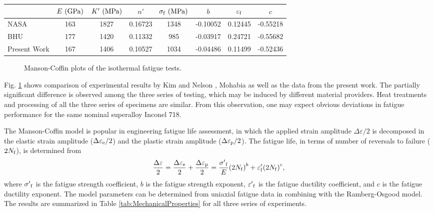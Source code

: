 \documentclass[preprint,5p,twocolumn,11pt,sort&compress]{elsarticle}
\begin{document}
\begin{table*}[htbp]
  \centering
  \caption{Basic properties of nickel-based superalloy Inconel 718 at 650$^{\circ}$C.}
    \begin{tabular}{lccccccc}
    \hline
          & $E {\rm\ (GPa)}$     & $K' {\rm\ (MPa)}$     & $n'$     & $\sigma_{\rm f} {\rm\ (MPa)}$    & $b$     & $\varepsilon_{\rm f}$    & $c$ \\
    \hline
    NASA \cite{kim1988elevated, nelson1992creep}  & 163 & 1827  & 0.16723 & 1348 & -0.10052 & 0.12445 & -0.55218 \\
    BHU   \cite{Mahobia2014}                                     & 177 & 1420  & 0.11332 & 985   & -0.03917 & 0.24721 & -0.55682 \\
    Present  Work                                                        & 167 & 1406 & 0.10527 & 1034  & -0.04486 & 0.11499 & -0.52436 \\
    \hline
    \end{tabular}%
  \label{tab:MechanicalProperties}%
\end{table*}%

\begin{figure}[!htp]
\caption{Manson-Coffin plots of the isothermal fatigue tests.}
\label{Fig:Baseline}
\end{figure}

Fig. \ref{Fig:Baseline} shows  comparison of experimental results by Kim \cite{kim1988elevated} and Nelson \cite{nelson1992creep}, Mohabia \cite{Mahobia2014} as well as the data from the present work. The partially significant difference is observed among the three series of testing, which may be induced by different material providers. Heat treatments and processing of all the three series of specimens are similar. From this observation, one may expect obvious deviations in fatigue performance for the same nominal superalloy Inconel 718. 

The Manson-Coffin model is popular in engineering fatigue life assessment, in which the applied strain amplitude $\Delta \varepsilon/2$ is decomposed in the elastic strain amplitude ($\Delta \varepsilon_{\rm e}/2$) and the plastic strain amplitude ($\Delta \varepsilon_{\rm p}/2$). The fatigue life, in terms of number of reversals to failure ($2N_{\rm f}$), is determined from
\begin{equation}
\frac{{\Delta \varepsilon }}{2} = \frac{{\Delta {\varepsilon _{\rm e}}}}{2} + \frac{{\Delta {\varepsilon _{\rm p}}}}{2} = \frac{{{{\sigma '}_{\rm f}}}}{E}{\left( {2{N_{\rm f}}} \right)^b} + {\varepsilon '_{\rm f}}{\left( {2{N_{\rm f}}} \right)^c},
\label{Equ:CoffinManson}
\end{equation}
where ${{{\sigma '}_{\rm f}}}$ is the fatigue strength coefficient, $b$ is the fatigue strength exponent, ${{{\varepsilon '}_{\rm f}}}$ is the fatigue ductility coefficient, and $c$ is the fatigue ductility exponent. The model parameters can be determined from uniaxial fatigue data in combining with the Ramberg-Osgood model. The results are summarized in Table \ref{tab:MechanicalProperties} for all three series of experiments.
\end{document}
